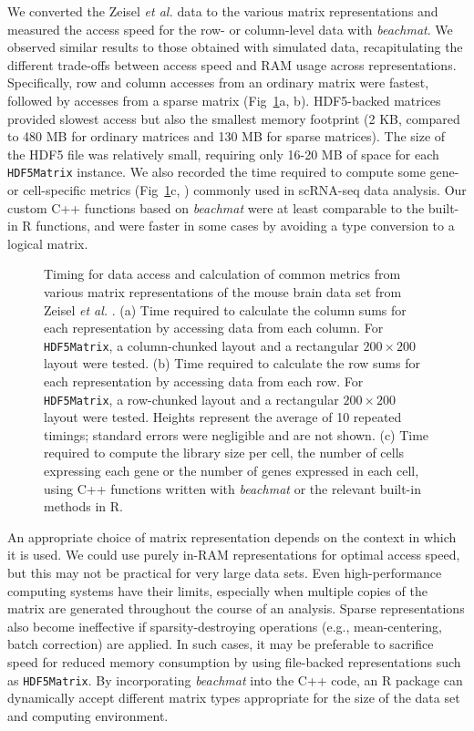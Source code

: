 \documentclass[10pt,letterpaper]{article}
\newcommand{\beachmat}{\textit{beachmat}}
\newcommand{\code}[1]{\texttt{#1}}
\begin{document}
We converted the Zeisel \textit{et al.} data to the various matrix representations and measured the access speed for the row- or column-level data with \beachmat{}.
We observed similar results to those obtained with simulated data, recapitulating the different trade-offs between access speed and RAM usage across representations.
Specifically, row and column accesses from an ordinary matrix were fastest, followed by accesses from a sparse matrix (Fig~\ref{fig:zeisel}a, b).
HDF5-backed matrices provided slowest access but also the smallest memory footprint (2 KB, compared to 480 MB for ordinary matrices and 130 MB for sparse matrices).
The size of the HDF5 file was relatively small, requiring only 16-20 MB of space for each \code{HDF5Matrix} instance.
We also recorded the time required to compute some gene- or cell-specific metrics (Fig~\ref{fig:zeisel}c, \suppsecrealzeisel{}) commonly used in scRNA-seq data analysis.
Our custom C++ functions based on \beachmat{} were at least comparable to the built-in R functions, and were faster in some cases by avoiding a type conversion to a logical matrix.

\begin{figure}[b]
    \caption{Timing for data access and calculation of common metrics from various matrix representations of the mouse brain data set from Zeisel \textit{et al.} \cite{zeisel2015brain}.
(a) Time required to calculate the column sums for each representation by accessing data from each column.
For \code{HDF5Matrix}, a column-chunked layout and a rectangular $200 \times 200$ layout were tested.
(b) Time required to calculate the row sums for each representation by accessing data from each row.
For \code{HDF5Matrix}, a row-chunked layout and a rectangular $200 \times 200$ layout were tested.
Heights represent the average of 10 repeated timings; standard errors were negligible and are not shown.
(c) Time required to compute the library size per cell, the number of cells expressing each gene or the number of genes expressed in each cell, using C++ functions written with \beachmat{} or the relevant built-in methods in R.}
    \label{fig:zeisel}
\end{figure}

An appropriate choice of matrix representation depends on the context in which it is used.
We could use purely in-RAM representations for optimal access speed, but this may not be practical for very large data sets.
Even high-performance computing systems have their limits, especially when multiple copies of the matrix are generated throughout the course of an analysis.
Sparse representations also become ineffective if sparsity-destroying operations (e.g., mean-centering, batch correction) are applied.
In such cases, it may be preferable to sacrifice speed for reduced memory consumption by using file-backed representations such as \code{HDF5Matrix}.
By incorporating \beachmat{} into the C++ code, an R package can dynamically accept different matrix types appropriate for the size of the data set and computing environment.
\end{document}
